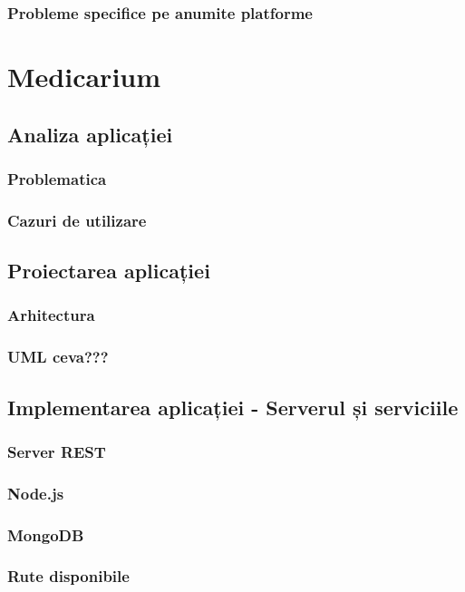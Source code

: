 \documentclass[a4paper]{article}
\begin{document}
\subsubsection{Probleme specifice pe anumite platforme}


\section{Medicarium}
\subsection{Analiza aplicației}
\subsubsection{Problematica}
\subsubsection{Cazuri de utilizare}

\subsection{Proiectarea aplicației}
\subsubsection{Arhitectura}
\subsubsection{UML ceva???}

\subsection{Implementarea aplicației - Serverul și serviciile}

\subsubsection{Server REST}
\subsubsection{Node.js}
\subsubsection{MongoDB}
\subsubsection{Rute disponibile}
\end{document}
